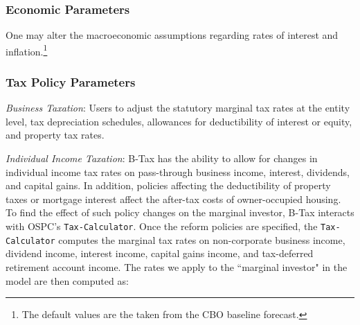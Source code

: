 \documentclass[article,11pt,letterpaper,fleqn]{article}
\theoremstyle{definition}
\numberwithin{equation}{section}
\begin{document}
\subsubsection{Economic Parameters}


One may alter the macroeconomic assumptions regarding rates of interest and inflation.\footnote{The default values are the taken from the CBO baseline forecast.}  


\subsubsection{Tax Policy Parameters}

\emph{Business Taxation}: Users to adjust the statutory marginal tax rates at the entity level, tax depreciation schedules, allowances for deductibility of interest or equity, and property tax rates.  

\emph{Individual Income Taxation}: B-Tax has the ability to allow for changes in individual income tax rates on pass-through business income, interest, dividends, and capital gains.  In addition, policies affecting the deductibility of property taxes or mortgage interest affect the after-tax costs of owner-occupied housing.  To find the effect of such policy changes on the marginal investor, B-Tax interacts with OSPC's \texttt{Tax-Calculator}. Once the reform policies are specified, the \texttt{Tax-Calculator} computes the marginal tax rates on non-corporate business income, dividend income, interest income, capital gains income, and tax-deferred retirement account income.  The rates we apply to the ``marginal investor" in the model are then computed as: 
\end{document}
